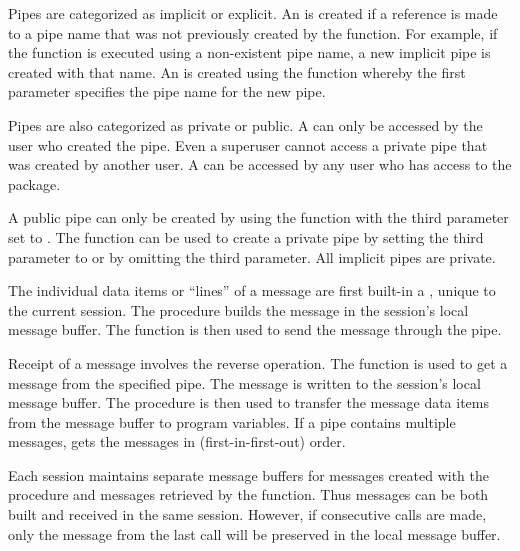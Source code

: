 \documentclass[letterpaper,10pt,english,openany,oneside]{sphinxmanual}
\begin{document}
Pipes are categorized as implicit or explicit. An  is
created if a reference is made to a pipe name that was not previously
created by the  function. For example, if the 
function is executed using a non-existent pipe name, a new implicit pipe
is created with that name. An  is created using the
 function whereby the first parameter specifies the pipe
name for the new pipe.

Pipes are also categorized as private or public. A  can
only be accessed by the user who created the pipe. Even a superuser
cannot access a private pipe that was created by another user. A  can be accessed by any user who has access to the 
package.

A public pipe can only be created by using the  function
with the third parameter set to . The  function can be
used to create a private pipe by setting the third parameter to  or
by omitting the third parameter. All implicit pipes are private.

The individual data items or “lines” of a message are first built-in a
, unique to the current session. The 
procedure builds the message in the session’s local message buffer. The
 function is then used to send the message through the
pipe.

Receipt of a message involves the reverse operation. The
 function is used to get a message from the specified
pipe. The message is written to the session’s local message buffer. The
 procedure is then used to transfer the message data
items from the message buffer to program variables. If a pipe contains
multiple messages,  gets the messages in 
(first-in-first-out) order.

Each session maintains separate message buffers for messages created
with the  procedure and messages retrieved by the
 function. Thus messages can be both built and received
in the same session. However, if consecutive  calls are
made, only the message from the last  call will be
preserved in the local message buffer.
\end{document}
